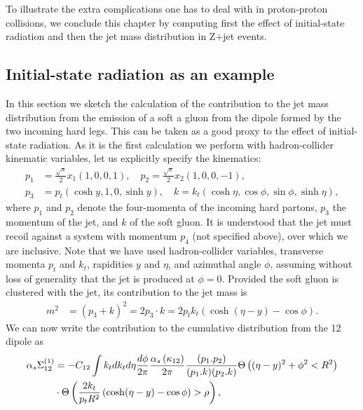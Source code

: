 To illustrate the extra complications one has to deal with in
proton-proton collisions, we conclude this chapter by computing first
the effect of initial-state radiation and then the jet mass
distribution in Z+jet events.


\subsection{Initial-state radiation as an example}\label{sec:ISR}

In this section we sketch the calculation of the contribution to the jet mass distribution from the emission of a soft a gluon from the dipole formed by the two incoming hard legs. This can be taken as a good proxy to the effect of initial-state radiation.
%
As it is the first calculation we perform with hadron-collider
kinematic variables, let us explicitly specify the
kinematics:
\begin{align}
p_1 &= \frac{\sqrt{s}}{2} x_1 \left (1,0,0,1 \right),\quad
p_2 = \frac{\sqrt{s}}{2} x_2 \left (1,0,0,-1 \right), \nonumber \\
p_3 &= p_t \left( \cosh y, 1,0,\sinh y \right), \quad
 k=  k_t \left(\cosh \eta, \cos \phi, \sin \phi, \sinh \eta \right), 
\end{align}
where $p_1$ and $p_2$ denote the four-momenta of the incoming hard
partons, $p_3$ the momentum of the jet, and $k$ of the soft gluon. It
is understood that the jet must recoil against a system with momentum
$p_4$ (not specified above), over which we are inclusive. 
Note that we have used hadron-collider variables, \ie transverse
momenta $p_t$ and $k_t$, rapidities $y$ and $\eta$, and azimuthal
angle $\phi$, assuming without loss of generality that the jet is
produced at $\phi=0$. 
%
Provided the soft gluon is clustered with the jet, its contribution to the jet mass is
\begin{align}
m^2&=(p_3+k)^2=2 p_3 \cdot k = 2 p_t k_t \left(\cosh (\eta-y) -\cos \phi \right).
\end{align}
%
We can now write the contribution to the cumulative distribution from
the 12 dipole as
\begin{align}
\alpha_s \Sigma^{(1)}_{12} &= -C_{12} \int k_t dk_t d\eta \frac{d\phi}{2\pi} \frac{\alpha_s \left (\kappa_{12} \right) }{2 \pi} \frac{(p_1.p_2)}{(p_1.k)(p_2.k)} \Theta \left ((\eta-y)^2+\phi^2 <R^2 \right)
\nonumber \\ & \cdot \Theta \left 
( \frac{2 k_t}{p_t R^2} \left (\cosh (\eta-y) -\cos \phi \right) > \rho \right),
\label{eq:initial-state-rad-interm}
\end{align}
